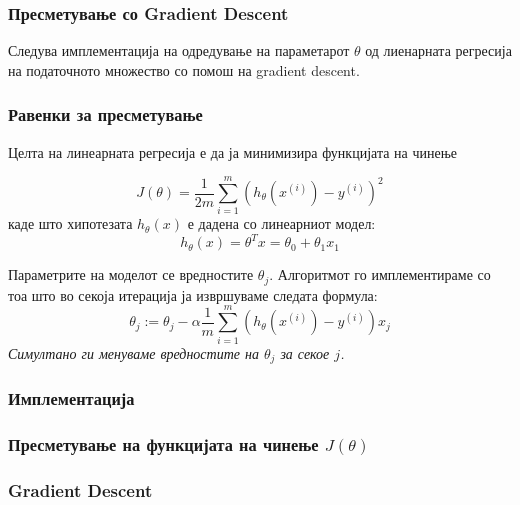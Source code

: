 \subsubsection{Пресметување со Gradient Descent}

Следува имплементација на одредување на параметарот $\theta$ од лиенарната
регресија на податочното множество со помош на gradient descent.

\subsubsection{Равенки за пресметување}

Целта на линеарната регресија е да ја минимизира функцијата на чинење

\[
	J(\theta) = \frac{1}{2m}\sum^m_{i=1}{(h_\theta(x^{(i)}) - y^{(i)})^2}
\]
каде што хипотезата $h_\theta(x)$ е дадена со линеарниот модел:
\[
	h_\theta(x) = \theta^Tx = \theta_0 + \theta_1x_1
\]

Параметрите на моделот се вредностите $\theta_j$.
Алгоритмот го имплементираме со тоа што во секоја итерација ја извршуваме
следата формула:
\[
	\theta_j := \theta_j - \alpha\frac{1}{m}\sum^m_{i=1}{(h_\theta(x^{(i)}) -
	y^{(i)}) x_j}
\]
\emph{Симултано ги менуваме вредностите на $\theta_j$ за секое $j$.}

\subsubsection{Имплементација}



\subsubsection{Пресметување на функцијата на чинење $J(\theta)$}



\subsubsection{Gradient Descent}



